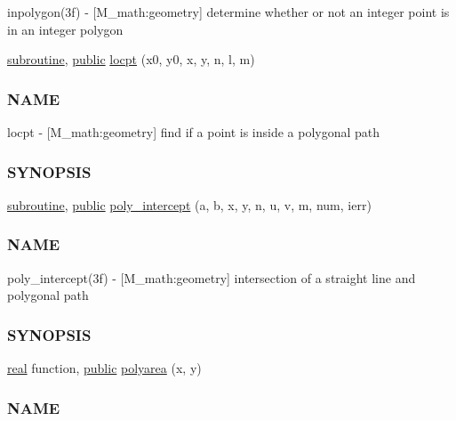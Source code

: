 \begin{DoxyCompactItemize}
\begin{DoxyCompactList}
inpolygon(3f) -\/ \mbox{[}M\+\_\+math\+:geometry\mbox{]} determine whether or not an integer point is in an integer polygon \end{DoxyCompactList}\item 
\hyperlink{M__stopwatch_83_8txt_acfbcff50169d691ff02d4a123ed70482}{subroutine}, \hyperlink{M__stopwatch_83_8txt_a2f74811300c361e53b430611a7d1769f}{public} \hyperlink{namespacem__math_ac5b38d6e45c30842b20c944bf2e88629}{locpt} (x0, y0, x, y, n, l, m)
\begin{DoxyCompactList}\small\item\em \subsubsection*{N\+A\+ME}

locpt -\/ \mbox{[}M\+\_\+math\+:geometry\mbox{]} find if a point is inside a polygonal path \subsubsection*{S\+Y\+N\+O\+P\+S\+IS}\end{DoxyCompactList}\item 
\hyperlink{M__stopwatch_83_8txt_acfbcff50169d691ff02d4a123ed70482}{subroutine}, \hyperlink{M__stopwatch_83_8txt_a2f74811300c361e53b430611a7d1769f}{public} \hyperlink{namespacem__math_ac25d73a9718db8167b0ad99331366553}{poly\+\_\+intercept} (a, b, x, y, n, u, v, m, num, ierr)
\begin{DoxyCompactList}\small\item\em \subsubsection*{N\+A\+ME}

poly\+\_\+intercept(3f) -\/ \mbox{[}M\+\_\+math\+:geometry\mbox{]} intersection of a straight line and polygonal path \subsubsection*{S\+Y\+N\+O\+P\+S\+IS}\end{DoxyCompactList}\item 
\hyperlink{read__watch_83_8txt_abdb62bde002f38ef75f810d3a905a823}{real} function, \hyperlink{M__stopwatch_83_8txt_a2f74811300c361e53b430611a7d1769f}{public} \hyperlink{namespacem__math_a2324f10703d77ef5fde6f502ac3e65f6}{polyarea} (x, y)
\begin{DoxyCompactList}\small\item\em \subsubsection*{N\+A\+ME}


\end{DoxyCompactList}
\end{DoxyCompactItemize}
